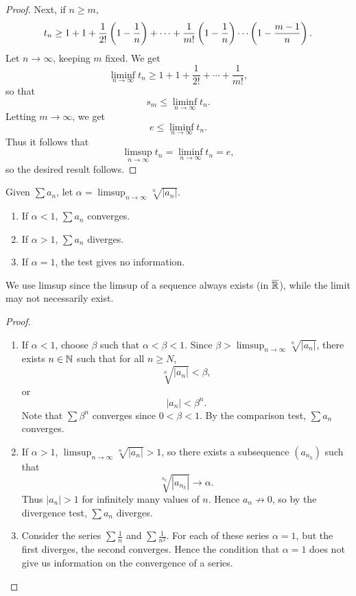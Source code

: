 \begin{example}
\begin{proof}
Next, if $n\ge m$,
\[t_n\ge1+1+\frac{1}{2!}\left(1-\frac{1}{n}\right)+\cdots+\frac{1}{m!}\left(1-\frac{1}{n}\right)\cdots\left(1-\frac{m-1}{n}\right).\]
Let $n\to\infty$, keeping $m$ fixed. We get
\[\liminf_{n\to\infty}t_n\ge1+1+\frac{1}{2!}+\cdots+\frac{1}{m!},\]
so that
\[s_m\le\liminf_{n\to\infty}t_n.\]
Letting $m\to\infty$, we get
\[e\le\liminf_{n\to\infty}t_n.\]
Thus it follows that
\[\limsup_{n\to\infty}t_n=\liminf_{n\to\infty}t_n=e,\]
so the desired result follows.
\end{proof}
\end{example}

\begin{lemma}\label{lemma:root-test}
Given $\sum a_n$, let $\displaystyle\alpha=\limsup_{n\to\infty}\sqrt[n]{|a_n|}$.
\begin{enumerate}[label=(\roman*)]
\item If $\alpha<1$, $\sum a_n$ converges.
\item If $\alpha>1$, $\sum a_n$ diverges.
\item If $\alpha=1$, the test gives no information.
\end{enumerate}
\end{lemma}

\begin{remark}
We use limsup since the limsup of a sequence always exists (in $\overline{\mathbb R}$), while the limit may not necessarily exist.
\end{remark}

\begin{proof} \
\begin{enumerate}[label=(\roman*)]
\item If $\alpha<1$, choose $\beta$ such that $\alpha<\beta<1$. Since $\displaystyle\beta>\limsup_{n\to\infty}\sqrt[n]{|a_n|}$, there exists $n\in\mathbb N$ such that for all $n\ge N$,
\[\sqrt[n]{|a_n|}<\beta,\]
or
\[|a_n|<\beta^n.\]
Note that $\sum\beta^n$ converges since $0<\beta<1$. By the comparison test, $\sum a_n$ converges.

\item If $\alpha>1$, $\displaystyle\limsup_{n\to\infty}\sqrt[n]{|a_n|}>1$, so there exists a subsequence $(a_{n_k})$ such that
\[\sqrt[n_k]{|a_{n_k}|}\to\alpha.\]
Thus $|a_n|>1$ for infinitely many values of $n$. Hence $a_n\not\to0$, so by the divergence test, $\sum a_n$ diverges.

\item Consider the series $\sum\frac{1}{n}$ and $\sum\frac{1}{n^2}$. For each of these series $\alpha=1$, but the first diverges, the second converges. Hence the condition that $\alpha=1$ does not give us information on the convergence of a series.
\end{enumerate}
\end{proof}

